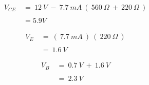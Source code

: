 {\bfseries\itshape{}}

\begin{flushright}
{\bfseries\itshape{}} \hfill \break
\end{flushright}

\begin{ceqn}
\begin{align}
V_{CE}\ &=\ 12\ V\ -\ 7.7\ mA\ (\ 560\ \Omega\ +\ 220\ \Omega\ ) \\ \\
&= 5.9 V
\end{align}
\end{ceqn} \hfill \break

{\bfseries\itshape{}}

\begin{flushright}
{\bfseries\itshape{}} \hfill \break
\end{flushright}

\begin{ceqn}
\begin{align}
V_{E}\ &=\ (\ 7.7\ mA\ )\ (\ 220\ \Omega\ ) \\ \\
&=\ 1.6\ V
\end{align}
\end{ceqn} \hfill \break

{\bfseries\itshape{}} 

\begin{flushright}
{\bfseries\itshape{}} \hfill \break
\end{flushright}

\begin{ceqn}
\begin{align}
V_{B}\ &=\ 0.7\ V\ +\ 1.6\ V \\ \\
&=\ 2.3\ V
\end{align}
\end{ceqn} 


